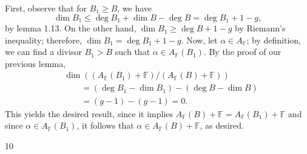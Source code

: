\documentclass[11pt]{article}
\makeatletter
\theoremstyle{scplain}
\renewenvironment{proof}[1][\proofname]{%
  \par\pushQED{\qed}\normalfont\topsep6\p@\@plus6\p@\relax
  \trivlist\item[\hskip\labelsep\scshape #1\@addpunct{.}]\ignorespaces}%
  {\popQED\endtrivlist\@endpefalse}
\makeatother
\begin{document}
\begin{proof}
First, observe that for $B_1 \geq B$, we have
\[
  \dim B_1 \leq \deg B_1 + \dim B - \deg B = \deg B_1 + 1 - g,
\]
by lemma 1.13. On the other hand, $\dim B_1 \geq \deg B + 1 - g$ by Riemann's
inequality; therefore, $\dim B_1 = \deg B_1 + 1 - g$. Now, let
$\alpha \in A_{\mathbb{F}}$; by definition, we can find a divisor $B_1 > B$
such that $\alpha \in A_{\mathbb{F}}(B_1)$. By the proof of our previous lemma,
{\small
\[
\begin{aligned}
  &\dim((A_{\mathbb{F}}(B_1)+\mathbb{F})/(A_{\mathbb{F}}(B)+\mathbb{F})) \\
  &\qquad= (\deg B_1-\dim B_1) - (\deg B-\dim B) \\
  &\qquad= (g-1)-(g-1)=0.
\end{aligned}
\]
}
This yields the desired result, since it implies
$A_{\mathbb{F}}(B)+\mathbb{F} = A_{\mathbb{F}}(B_1)+\mathbb{F}$ and since
$\alpha \in A_{\mathbb{F}}(B_1)$, it follows that
$\alpha \in A_{\mathbb{F}}(B)+\mathbb{F}$, as desired.
\end{proof}

\begin{center}10\end{center}
\end{document}

